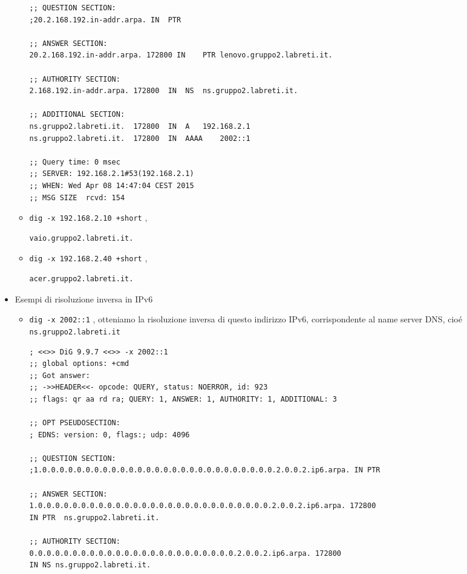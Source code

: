 \documentclass[9pt, a4paper, oneside]{article}
\begin{document}
\begin{itemize}
\begin{itemize}
\begin{verbatim}
;; QUESTION SECTION:
;20.2.168.192.in-addr.arpa.	IN	PTR

;; ANSWER SECTION:
20.2.168.192.in-addr.arpa. 172800 IN	PTR	lenovo.gruppo2.labreti.it.

;; AUTHORITY SECTION:
2.168.192.in-addr.arpa.	172800	IN	NS	ns.gruppo2.labreti.it.

;; ADDITIONAL SECTION:
ns.gruppo2.labreti.it.	172800	IN	A	192.168.2.1
ns.gruppo2.labreti.it.	172800	IN	AAAA	2002::1

;; Query time: 0 msec
;; SERVER: 192.168.2.1#53(192.168.2.1)
;; WHEN: Wed Apr 08 14:47:04 CEST 2015
;; MSG SIZE  rcvd: 154

								\end{verbatim}
							\item
								\texttt{dig -x 192.168.2.10 +short} , 
								\begin{verbatim}
vaio.gruppo2.labreti.it.
								\end{verbatim}
							\item
								\texttt{dig -x 192.168.2.40 +short} , 
								\begin{verbatim}
acer.gruppo2.labreti.it.
								\end{verbatim}
						\end{itemize}
					\item
						Esempi di risoluzione 
						inversa in IPv6
						\begin{itemize}
							\item
								\texttt{dig -x 2002::1} , 
								otteniamo la 
								risoluzione 
								inversa di 
								questo 
								indirizzo  
								IPv6, 
								corrispondente 
								al name server 
								DNS, cio\'e
								\texttt{ns.gruppo2.labreti.it}
								\begin{verbatim}
; <<>> DiG 9.9.7 <<>> -x 2002::1
;; global options: +cmd
;; Got answer:
;; ->>HEADER<<- opcode: QUERY, status: NOERROR, id: 923
;; flags: qr aa rd ra; QUERY: 1, ANSWER: 1, AUTHORITY: 1, ADDITIONAL: 3

;; OPT PSEUDOSECTION:
; EDNS: version: 0, flags:; udp: 4096

;; QUESTION SECTION:
;1.0.0.0.0.0.0.0.0.0.0.0.0.0.0.0.0.0.0.0.0.0.0.0.0.0.0.0.2.0.0.2.ip6.arpa. IN PTR

;; ANSWER SECTION:
1.0.0.0.0.0.0.0.0.0.0.0.0.0.0.0.0.0.0.0.0.0.0.0.0.0.0.0.2.0.0.2.ip6.arpa. 172800 
IN PTR	ns.gruppo2.labreti.it.

;; AUTHORITY SECTION:
0.0.0.0.0.0.0.0.0.0.0.0.0.0.0.0.0.0.0.0.0.0.0.0.2.0.0.2.ip6.arpa. 172800 
IN NS ns.gruppo2.labreti.it.


\end{verbatim}
\end{itemize}
\end{itemize}
\end{document}
